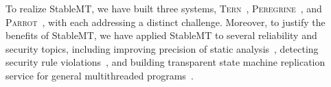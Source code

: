 \documentclass[10pt,onecolumn,letterpaper]{article}
\newcommand{\tern}[0]{\textsc{Tern}\xspace}
\newcommand{\peregrine}[0]{\textsc{Peregrine}\xspace}
\newcommand{\parrot}[0]{\textsc{Parrot}\xspace}
\begin{document}
\begin{sloppypar}
To realize StableMT, we have built three systems, \tern~\cite{cui:tern:osdi10}, 
\peregrine~\cite{peregrine:sosp11},  and \parrot~\cite{parrot:sosp13}, with 
each addressing a distinct challenge. Moreover, to justify the benefits of 
StableMT, we have applied StableMT to several reliability and security 
topics, including improving precision of static analysis~\cite{wu:pldi12}, 
detecting security rule violations~\cite{woodpecker:asplos13}, and building 
transparent state machine replication service for general multithreaded 
programs~\cite{crane:sosp15}.

\end{sloppypar}

{
 
 
}
\end{document}
